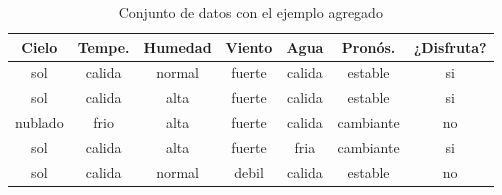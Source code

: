 \documentclass[a4paper]{article}
\begin{document}
\begin{table}[h]
  \centering
  \begin{tabular}{ccccccc}
  Cielo                          & Tempe. & Humedad & Viento                        & Agua   & Pronós.    & ¿Disfruta?                \\ \hline
  {\color[HTML]{009901} sol}     & calida & normal  & {\color[HTML]{009901} fuerte} & calida & estable   & {\color[HTML]{009901} si} \\
  {\color[HTML]{009901} sol}     & calida & alta    & fuerte                        & calida & estable   & {\color[HTML]{009901} si} \\
  {\color[HTML]{CB0000} nublado} & frio   & alta    & fuerte                        & calida & cambiante & {\color[HTML]{CB0000} no} \\
  {\color[HTML]{009901} sol}     & calida & alta    & fuerte                        & fria   & cambiante & {\color[HTML]{009901} si} \\
  {\color[HTML]{009901} sol}     & calida & normal  & {\color[HTML]{CB0000} debil}  & calida & estable   & {\color[HTML]{CB0000} no}
  \end{tabular}
  \caption{Conjunto de datos con el ejemplo agregado}
  \label{tab:dataset-2}
  \end{table}
    
\end{document}
